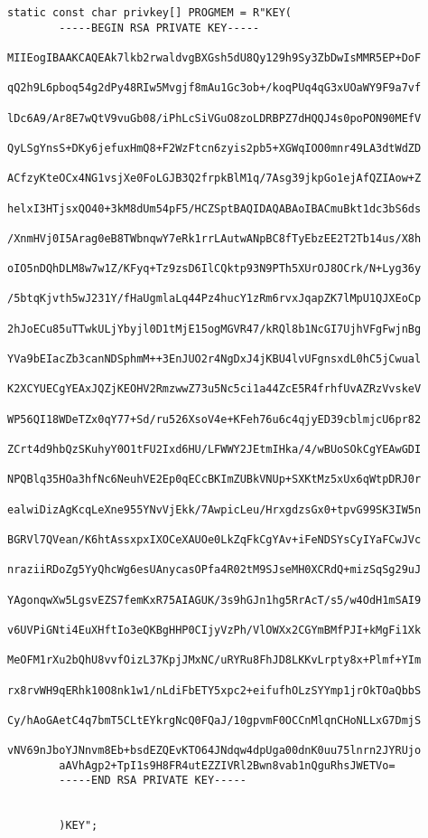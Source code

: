 \begin{flushleft}
\begin{lstlisting}[style=CStyle]
		static const char privkey[] PROGMEM = R"KEY(
		-----BEGIN RSA PRIVATE KEY-----
		MIIEogIBAAKCAQEAk7lkb2rwaldvgBXGsh5dU8Qy129h9Sy3ZbDwIsMMR5EP+DoF
		qQ2h9L6pboq54g2dPy48RIw5Mvgjf8mAu1Gc3ob+/koqPUq4qG3xUOaWY9F9a7vf
		lDc6A9/Ar8E7wQtV9vuGb08/iPhLcSiVGuO8zoLDRBPZ7dHQQJ4s0poPON90MEfV
		QyLSgYnsS+DKy6jefuxHmQ8+F2WzFtcn6zyis2pb5+XGWqIOO0mnr49LA3dtWdZD
		ACfzyKteOCx4NG1vsjXe0FoLGJB3Q2frpkBlM1q/7Asg39jkpGo1ejAfQZIAow+Z
		helxI3HTjsxQO40+3kM8dUm54pF5/HCZSptBAQIDAQABAoIBACmuBkt1dc3bS6ds
		/XnmHVj0I5Arag0eB8TWbnqwY7eRk1rrLAutwANpBC8fTyEbzEE2T2Tb14us/X8h
		oIO5nDQhDLM8w7w1Z/KFyq+Tz9zsD6IlCQktp93N9PTh5XUrOJ8OCrk/N+Lyg36y
		/5btqKjvth5wJ231Y/fHaUgmlaLq44Pz4hucY1zRm6rvxJqapZK7lMpU1QJXEoCp
		2hJoECu85uTTwkULjYbyjl0D1tMjE15ogMGVR47/kRQl8b1NcGI7UjhVFgFwjnBg
		YVa9bEIacZb3canNDSphmM++3EnJUO2r4NgDxJ4jKBU4lvUFgnsxdL0hC5jCwual
		K2XCYUECgYEAxJQZjKEOHV2RmzwwZ73u5Nc5ci1a44ZcE5R4frhfUvAZRzVvskeV
		WP56QI18WDeTZx0qY77+Sd/ru526XsoV4e+KFeh76u6c4qjyED39cblmjcU6pr82
		ZCrt4d9hbQzSKuhyY0O1tFU2Ixd6HU/LFWWY2JEtmIHka/4/wBUoSOkCgYEAwGDI
		NPQBlq35HOa3hfNc6NeuhVE2Ep0qECcBKImZUBkVNUp+SXKtMz5xUx6qWtpDRJ0r
		ealwiDizAgKcqLeXne955YNvVjEkk/7AwpicLeu/HrxgdzsGx0+tpvG99SK3IW5n
		BGRVl7QVean/K6htAssxpxIXOCeXAUOe0LkZqFkCgYAv+iFeNDSYsCyIYaFCwJVc
		nraziiRDoZg5YyQhcWg6esUAnycasOPfa4R02tM9SJseMH0XCRdQ+mizSqSg29uJ
		YAgonqwXw5LgsvEZS7femKxR75AIAGUK/3s9hGJn1hg5RrAcT/s5/w4OdH1mSAI9
		v6UVPiGNti4EuXHftIo3eQKBgHHP0CIjyVzPh/VlOWXx2CGYmBMfPJI+kMgFi1Xk
		MeOFM1rXu2bQhU8vvfOizL37KpjJMxNC/uRYRu8FhJD8LKKvLrpty8x+Plmf+YIm
		rx8rvWH9qERhk10O8nk1w1/nLdiFbETY5xpc2+eifufhOLzSYYmp1jrOkTOaQbbS
		Cy/hAoGAetC4q7bmT5CLtEYkrgNcQ0FQaJ/10gpvmF0OCCnMlqnCHoNLLxG7DmjS
		vNV69nJboYJNnvm8Eb+bsdEZQEvKTO64JNdqw4dpUga00dnK0uu75lnrn2JYRUjo
		aAVhAgp2+TpI1s9H8FR4utEZZIVRl2Bwn8vab1nQguRhsJWETVo=
		-----END RSA PRIVATE KEY-----
		
		
		)KEY";
		
	\end{lstlisting}
\end{flushleft}

\newpage